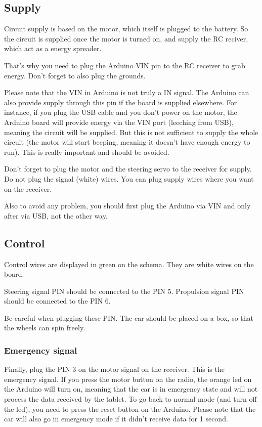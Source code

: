 \documentclass[a4paper,11pt]{report}
\begin{document}
\subsection{Supply}
Circuit supply is based on the motor, which itself is plugged to the
battery. So the circuit is supplied once the motor is turned on, and supply the
RC reciver, which act as a energy spreader.

That's why you need to plug the Arduino VIN pin to the RC receiver to grab
energy. Don't forget to also plug the grounds.

Please note that the VIN in Arduino is not truly a IN signal. The Arduino can
also provide supply through this pin if the board is supplied elsewhere. For
instance, if you plug the USB cable and you don't power on the motor, the
Arduino board will provide energy via the VIN port (leeching from USB), meaning
the circuit will be supplied. But this is not sufficient to supply the whole
circuit (the motor will start beeping, meaning it doesn't have enough energy to
run). This is really important and should be avoided.

Don't forget to plug the motor and the steering servo to the receiver for
supply. Do not plug the signal (white) wires. You can plug supply wires where
you want on the receiver.

Also to avoid any problem, you should first plug the Arduino via VIN and only
after via USB, not the other way.

\subsection{Control}

Control wires are displayed in green on the schema. They are white wires on the
board.

Steering signal PIN should be connected to the PIN 5.
Propulsion signal PIN should be connected to the PIN 6.

Be careful when plugging these PIN. The car should be placed on a box, so that
the wheels can spin freely.

\subsubsection{Emergency signal}
\label{subsec:emergency}

Finally, plug the PIN 3 on the motor signal on the receiver. This is the
emergency signal. If you press the motor button on the radio, the orange led on
the Arduino will turn on, meaning that the car is in emergency state and will not
process the data received by the tablet. To go back to normal mode (and turn
off the led), you need to press the reset button on the Arduino. Please note
that the car will also go in emergency mode if it didn't receive data for 1
second.
\end{document}
